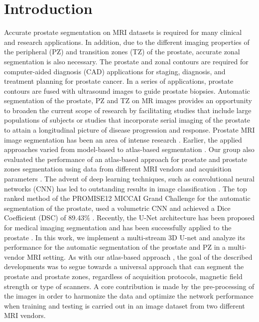 \section{Introduction}
\label{sec:intro}
Accurate prostate segmentation on MRI datasets is required for many clinical and research applications. In addition, due to the different imaging properties of the peripheral (PZ) and transition zones (TZ) of the prostate, accurate zonal segmentation is also necessary. The prostate and zonal contours are required for computer-aided diagnosis (CAD) applications for staging, diagnosis, and treatment planning for prostate cancer. In a series of applications, prostate contours are fused with ultrasound images to guide prostate biopsies. Automatic segmentation of the prostate, PZ and TZ on MR images provides an opportunity to broaden the current scope of research by facilitating studies that include large populations of subjects or studies that incorporate serial imaging of the prostate to attain a longitudinal picture of disease progression and response.  Prostate MRI image segmentation has been an area of intense research \cite{litjens2014evaluation}. Earlier, the applied approaches varied from model-based \cite{chowdhury2012concurrent,toth2012multifeature} to atlas-based segmentation \cite{4_klein2008automatic,5_cheng2014atlas,6_xie2014low,7_tian2015fully,8_korsager2015use,9_chilali2016gland}.  Our group also evaluated the performance of an atlas-based approach for prostate and prostate zones segmentation using data from different MRI vendors and acquisition parameters \cite{10_padgett2018towards}. The advent of deep learning techniques, such as convolutional neural networks (CNN) has led to outstanding results in image classification \cite{11_krizhevsky2012imagenet,12_simonyan2011immediate}.  The top ranked method of the PROMISE12 MICCAI Grand Challenge  for the automatic segmentation of the prostate,\cite{litjens2014evaluation}  used a volumetric CNN and achieved a Dice Coefficient (DSC) of 89.43\% \cite{yu2017volumetric}.  Recently, the U-Net architecture has been proposed \cite{13_ronneberger2015u} for medical imaging segmentation and has been successfully applied to the prostate  \cite{anneke}. 
In this work, we implement a multi-stream 3D U-net and analyze its performance for the automatic segmentation of the prostate and PZ in a multi-vendor MRI setting. As with our atlas-based approach \cite{10_padgett2018towards}, the goal of the described developments was to segue towards a universal approach that can segment the prostate and prostate zones, regardless of acquisition protocols, magnetic field strength or type of scanners. A core contribution is made by the pre-processing of the images in order to harmonize the data and optimize the network performance when training and testing is carried out in an image dataset from two different MRI vendors. 
